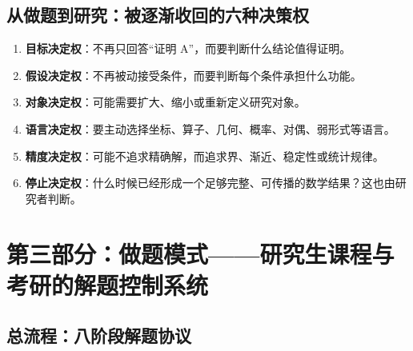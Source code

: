 \documentclass[11pt,a4paper]{ctexart}
\newcommand{\keyword}[1]{\textbf{#1}}
\begin{document}
\subsection{从做题到研究：被逐渐收回的六种决策权}

\begin{enumerate}
  \item \keyword{目标决定权}：不再只回答“证明 A”，而要判断什么结论值得证明。
  \item \keyword{假设决定权}：不再被动接受条件，而要判断每个条件承担什么功能。
  \item \keyword{对象决定权}：可能需要扩大、缩小或重新定义研究对象。
  \item \keyword{语言决定权}：要主动选择坐标、算子、几何、概率、对偶、弱形式等语言。
  \item \keyword{精度决定权}：可能不追求精确解，而追求界、渐近、稳定性或统计规律。
  \item \keyword{停止决定权}：什么时候已经形成一个足够完整、可传播的数学结果？这也由研究者判断。
\end{enumerate}

\section{第三部分：做题模式——研究生课程与考研的解题控制系统}

\subsection{总流程：八阶段解题协议}
\end{document}
